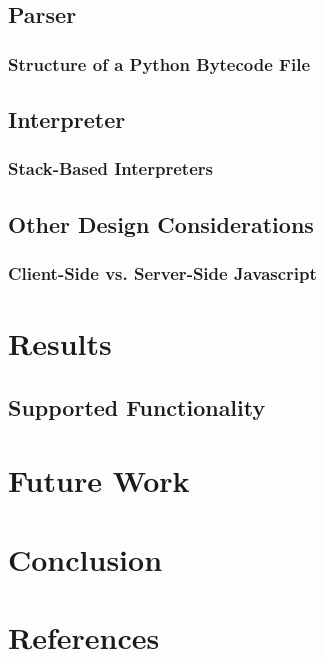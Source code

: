 \documentclass[10pt,a4paper]{article}
\begin{document}
\subsection{Parser}

\subsubsection{Structure of a Python Bytecode File}

\subsection{Interpreter}


\subsubsection{Stack-Based Interpreters} 

\subsection{Other Design Considerations}
\subsubsection{Client-Side vs. Server-Side Javascript}

\section{Results}
\subsection{Supported Functionality}


\section{Future Work}

\section{Conclusion}

\section{References} %
\end{document}
